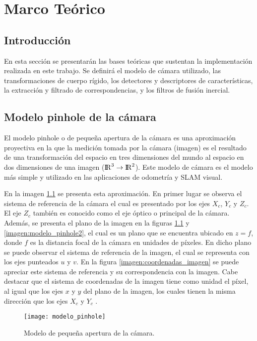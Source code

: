 \chapter{Marco Teórico}
\label{capitulo3}


\section{Introducción}

En esta sección se presentarán las bases teóricas que sustentan la implementación realizada en este trabajo. Se definirá el modelo de cámara utilizado, las transformaciones de cuerpo rígido, los detectores y descriptores de características, la extracción y filtrado de correspondencias, y los filtros de fusión inercial.


\section{Modelo pinhole de la cámara}
El modelo pinhole o de pequeña apertura de la cámara es una aproximación proyectiva en la que la medición tomada por la cámara (imagen) es el resultado de una transformación del espacio en tres dimensiones del mundo  al espacio en dos dimensiones de una imagen (${\rm I\!R}^3 \to {\rm I\!R}^2$). Este modelo de cámara es el modelo más simple y utilizado en las aplicaciones de odometría y SLAM visual.

En la imagen  \ref{imagen:modelo_pinhole} se presenta esta aproximación. En primer lugar se observa el sistema de referencia de la cámara el cual es presentado por los ejes $X_{c}$, $Y_{c}$ y $Z_{c}$. El eje $Z_{c}$ también es conocido como el eje óptico o principal de la cámara. Además, se presenta el plano de la imagen en la figuras \ref{imagen:modelo_pinhole} y \ref{imagen:modelo_pinhole2}, el cual es un plano que se encuentra ubicado en $z= f$, donde $f$ es la distancia focal de la cámara en unidades de píxeles. En dicho plano se puede observar el sistema de referencia de la imagen, el cual se representa con los ejes punteados $u$ y $v$. En la figura \ref{imagen:coordenadas_imagen} se puede apreciar este sistema de referencia y su correspondencia con la imagen. Cabe destacar que el sistema de coordenadas de la imagen tiene como unidad el píxel, al igual que los ejes $x$ y $y$ del plano de la imagen, los cuales tienen la misma dirección que los ejes $X_{c}$ y $Y_{c}$ .


\begin{figure}[H]
	\centering
	\texttt{[image: modelo\_pinhole]}
	\caption[Modelo de apertura pequeña de la cámara]{Modelo de  pequeña apertura de la cámara\protect\footnotemark.}
	\label{imagen:modelo_pinhole}
\end{figure}

